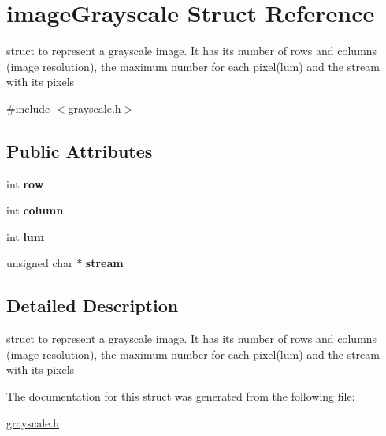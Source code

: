 \hypertarget{structimageGrayscale}{}\section{image\+Grayscale Struct Reference}
\label{structimageGrayscale}


struct to represent a grayscale image. It has its number of rows and columns (image resolution), the maximum number for each pixel(lum) and the stream with its pixels  




{\ttfamily \#include $<$grayscale.\+h$>$}

\subsection*{Public Attributes}
\begin{DoxyCompactItemize}
\item 
\mbox{\label{structimageGrayscale_a125b73b5911a7b328f424871eeaebdb1}} 
int {\bfseries row}
\item 
\mbox{\label{structimageGrayscale_a363fe975e1455bec100cfcbf3ee4e763}} 
int {\bfseries column}
\item 
\mbox{\label{structimageGrayscale_a53a10ce465abdfadbc385acea367a8d3}} 
int {\bfseries lum}
\item 
\mbox{\label{structimageGrayscale_a5f426f6b341657e87c2ad6cc211a023a}} 
unsigned char $\ast$ {\bfseries stream}
\end{DoxyCompactItemize}


\subsection{Detailed Description}
struct to represent a grayscale image. It has its number of rows and columns (image resolution), the maximum number for each pixel(lum) and the stream with its pixels 

The documentation for this struct was generated from the following file\+:\begin{DoxyCompactItemize}
\item 
\hyperlink{grayscale_8h}{grayscale.\+h}\end{DoxyCompactItemize}
